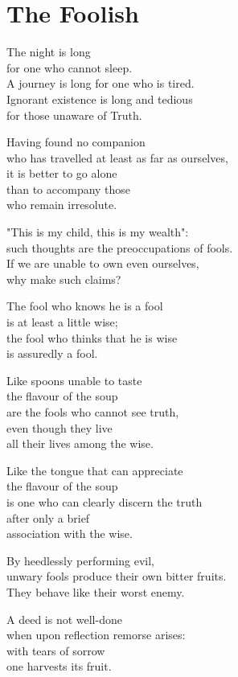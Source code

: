 
\chapter{The Foolish}

The night is long\\
for one who cannot sleep.\\
A journey is long for one who is tired.\\
Ignorant existence is long and tedious\\
for those unaware of Truth.


Having found no companion\\
who has travelled at least as far as ourselves,\\
it is better to go alone\\
than to accompany those\\
who remain irresolute.


"This is my child, this is my wealth":\\
such thoughts are the preoccupations of fools.\\
If we are unable to own even ourselves,\\
why make such claims?


The fool who knows he is a fool\\
is at least a little wise;\\
the fool who thinks that he is wise\\
is assuredly a fool.


Like spoons unable to taste\\
the flavour of the soup\\
are the fools who cannot see truth,\\
even though they live\\
all their lives among the wise.


Like the tongue that can appreciate\\
the flavour of the soup\\
is one who can clearly discern the truth\\
after only a brief\\
association with the wise.


By heedlessly performing evil,\\
unwary fools produce their own bitter fruits.\\
They behave like their worst enemy.

A deed is not well-done\\
when upon reflection remorse arises:\\
with tears of sorrow\\
one harvests its fruit.


